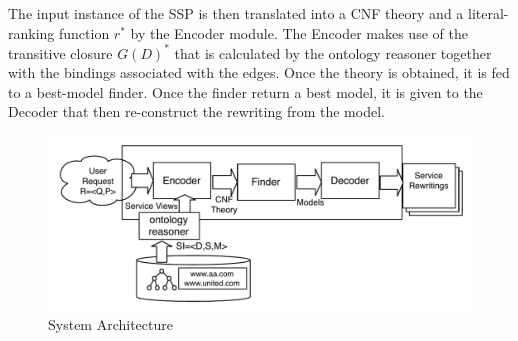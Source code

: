 \documentclass{llncs}
\begin{document}
The input instance of the SSP is then translated into a CNF theory and a
literal-ranking function $r^*$ by the Encoder module. The Encoder makes use
of the transitive closure $G(D)^*$ that is calculated by the ontology reasoner
together with the bindings associated with the edges. Once the theory is obtained,
it is fed to a best-model finder. Once the finder return a best model, it is
given to the Decoder that then re-construct the rewriting from the model.

\begin{figure}[t]
\centering
\includegraphics[width=.8\textwidth]{architecture}
\caption{System Architecture}
\label{fig:architecture}
\end{figure}
\end{document}
